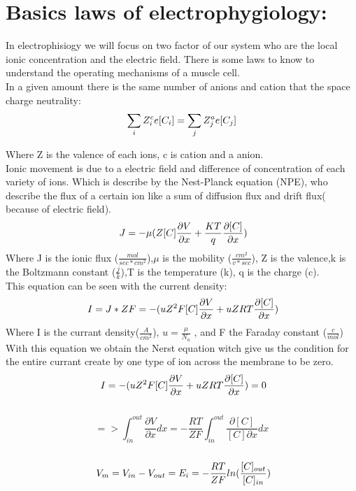 \documentclass[a4paper,10pt]{report}
\begin{document}
\section{Basics laws of electrophygiology:}


In electrophisiogy we will focus on two factor of our system who are the local ionic concentration and the electric field.
There is some laws to know to understand the operating mechanisms of a muscle cell.\\
In a given amount there is the same number of anions and cation that the space charge neutrality:
$$
	\sum_{i}Z_{i}^{c}e[C_{i}]=\sum_{j}Z_{j}^{a}e[C_{j}] \\
$$

Where Z is the valence of each ions, c is cation and a anion.\\
Ionic movement is due to a electric field and difference of concentration of each variety of ions. Which is describe by the Nest-Planck equation (NPE), who describe the flux of a certain ion like a sum of diffusion flux and drift flux( because of electric field).\\
$$
	\ J=-\mu(Z[C]\frac{\partial{V}}{\partial{x}}+\frac{KT}{q}\frac{\partial{[C]}}{\partial{x}}) \\
$$
 Where J is the ionic flux ($ \frac{mol}{sec*cm^2} $),$\mu$ is the mobility ($ \frac{cm^2}{v*sec}$), Z is the valence,k is the Boltzmann constant ($ \frac{j}{k}$),T is the temperature (k), q is the charge (c).\\
 This equation can be seen with the current density:\\
 $$
 \ I=J*ZF=-(uZ^2F[C]\frac{\partial{V}}{\partial{x}}+uZRT\frac{\partial{[C]}}{\partial{x}}) \\
 $$
 Where I is the currant density($\frac{A}{cm^2}$),  $u=\frac{\mu}{N_{a}}$ , and F the Faraday constant ($\frac{c}{mol}$)\\
 With this equation we obtain the Nerst equation witch give us the condition for the entire currant create by one type of ion across the membrane to be zero.\\
 $$
 \ I=-(uZ^2F[C]\frac{\partial{V}}{\partial{x}}+uZRT\frac{\partial{[C]}}{\partial{x}})=0 \\
 $$
 \\
 $$
 => \int_{in}^{out} \frac{\partial{V}}{\partial{x}}dx=- \frac{RT}{ZF} \int_{in}^{out} \frac{\partial{[C]}}{[C]\partial{x}}dx
 $$
 \\
 $$
 \ V_{m}=V_{in}-V_{out}=E_{i}=-\frac{RT}{ZF}ln(\frac{[C]_{out}}{[C]_{in}}) \\
 $$
\end{document}
